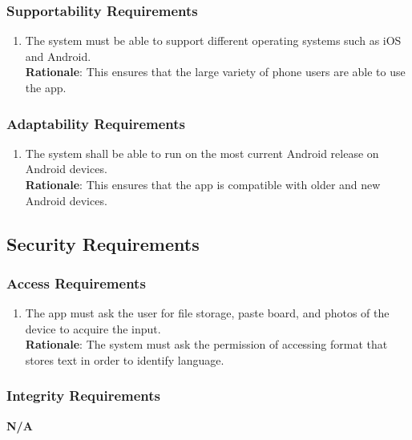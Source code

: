 \subsubsection{Supportability Requirements}
\label{ssub:supportability_requirements}
\begin{enumerate}[{MS-S}1. ]
	\item The system must be able to support different operating systems such as iOS and Android. 
	\\ \textbf{Rationale}: This ensures that the large variety of phone users are able to use the app. 
\end{enumerate}

\subsubsection{Adaptability Requirements}
\label{ssub:adaptability_requirements}
\begin{enumerate}[{MS-A}1. ]
	\item The system shall be able to run on the most current Android release on Android devices. 
	\\ \textbf{Rationale}: This ensures that the app is compatible with older and new Android devices.
\end{enumerate}


\subsection{Security Requirements}
\label{sub:security_requirements}

\subsubsection{Access Requirements}
\label{ssub:access_requirements}
\begin{enumerate}[{SR-AC}1. ]
	\item The app must ask the user for file storage, paste board, and photos of the device to acquire the input. 
	\\ \textbf{Rationale}: The system must ask the permission of accessing format that stores text in order to identify language. 
\end{enumerate}

\subsubsection{Integrity Requirements}
\label{ssub:integrity_requirements}
\textbf{N/A}

